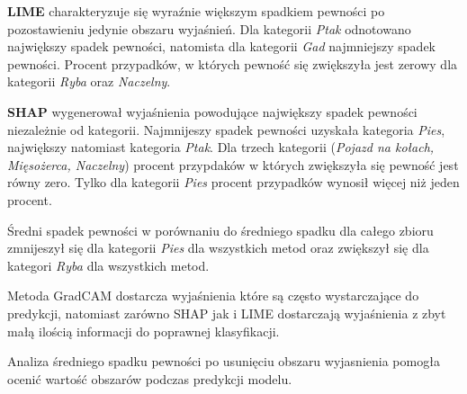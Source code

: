 \textbf{LIME} charakteryzuje się wyraźnie większym spadkiem pewności po pozostawieniu jedynie obszaru wyjaśnień.
Dla kategorii \textit{Ptak} odnotowano największy spadek pewności, natomista dla kategorii \textit{Gad} najmniejszy spadek pewności.
Procent przypadków, w których pewność się zwiększyła jest zerowy dla kategorii \textit{Ryba} oraz \textit{Naczelny}.

\textbf{SHAP} wygenerował wyjaśnienia powodujące największy spadek pewności niezależnie od kategorii.
Najmnijeszy spadek pewności uzyskała kategoria \textit{Pies}, największy natomiast kategoria \textit{Ptak}.
Dla trzech kategorii (\textit{Pojazd na kołach, Mięsożerca, Naczelny}) procent przypdaków w których zwiększyła się pewność jest równy zero.
Tylko dla kategorii \textit{Pies} procent przypadków wynosił więcej niż jeden procent.

Średni spadek pewności w porównaniu do średniego spadku dla całego zbioru zmnijeszył się dla kategorii \textit{Pies} dla wszystkich metod oraz zwiększył się dla kategori \textit{Ryba} dla wszystkich metod.

Metoda GradCAM dostarcza wyjaśnienia które są często wystarczające do predykcji, natomiast zarówno SHAP jak i LIME dostarczają wyjaśnienia z zbyt małą ilością informacji do poprawnej klasyfikacji.

\vspace{1cm}

Analiza średniego spadku pewności po usunięciu obszaru wyjasnienia pomogła ocenić wartość obszarów podczas predykcji modelu.

